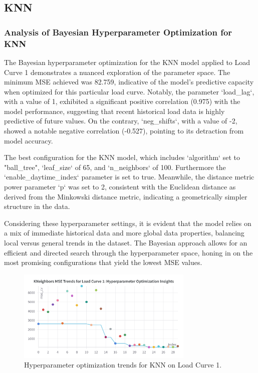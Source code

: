\documentclass{article} %
\begin{document}
\subsection{KNN}
\subsubsection{Analysis of Bayesian Hyperparameter Optimization for KNN}

The Bayesian hyperparameter optimization for the \gls{KNN} model applied to Load Curve 1 demonstrates a nuanced exploration of the parameter space. The minimum \gls{MSE} achieved was 82.759, indicative of the model's predictive capacity when optimized for this particular load curve. Notably, the parameter `load\_lag`, with a value of 1, exhibited a significant positive correlation (0.975) with the model performance, suggesting that recent historical load data is highly predictive of future values. On the contrary, `neg\_shifts`, with a value of -2, showed a notable negative correlation (-0.527), pointing to its detraction from model accuracy.

The best configuration for the \gls{KNN} model, which includes `algorithm` set to "ball\_tree", `leaf\_size` of 65, and `n\_neighbors` of 100. Furthermore the `enable\_daytime\_index` parameter is set to true. Meanwhile, the distance metric power parameter `p` was set to 2, consistent with the Euclidean distance as derived from the Minkowski distance metric, indicating a geometrically simpler structure in the data.

Considering these hyperparameter settings, it is evident that the model relies on a mix of immediate historical data and more global data properties, balancing local versus general trends in the dataset. The Bayesian approach allows for an efficient and directed search through the hyperparameter space, honing in on the most promising configurations that yield the lowest \gls{MSE} values.

\begin{figure}[H]
    \centering
    \includegraphics[width=0.75\textwidth]{ressources/Hyperparams/KNN/KNeighbors MSE Trends for Load Curve 1 Hyperparameter Optimization Insights.png}
    \caption{Hyperparameter optimization trends for KNN on Load Curve 1.}
    \label{fig:knn_lc1}
\end{figure}
\end{document}
